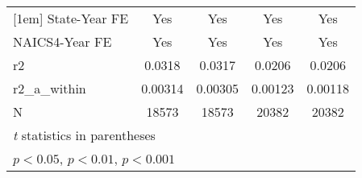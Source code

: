 {\begin{tabular}{l*{4}{c}}
[1em]
State-Year FE&         Yes         &         Yes         &         Yes         &         Yes         \\
[1em]
NAICS4-Year FE&         Yes         &         Yes         &         Yes         &         Yes         \\
\hline
r2          &      0.0318         &      0.0317         &      0.0206         &      0.0206         \\
r2\_a\_within &     0.00314         &     0.00305         &     0.00123         &     0.00118         \\
N           &       18573         &       18573         &       20382         &       20382         \\
\hline\hline
\multicolumn{5}{l}{\footnotesize \textit{t} statistics in parentheses}\\
\multicolumn{5}{l}{\footnotesize \sym{*} \(p<0.05\), \sym{**} \(p<0.01\), \sym{***} \(p<0.001\)}\\
\end{tabular}
}

